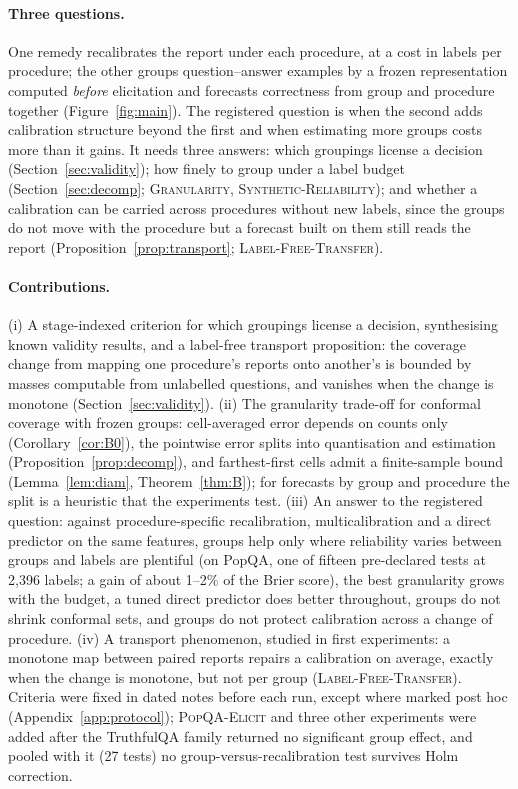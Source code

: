 \documentclass[twoside]{article}
\theoremstyle{definition}
\theoremstyle{remark}
\newcommand{\1}{\mathbf{1}}
\newcommand{\expname}[1]{\textsc{#1}}
\begin{document}
\paragraph{Three questions.} One remedy recalibrates the report under each procedure, at a cost in labels per
procedure; the other groups question--answer examples by a frozen representation computed \emph{before}
elicitation and forecasts correctness from group and procedure together (Figure~\ref{fig:main}). The registered
question is when the second adds calibration structure beyond the first and when estimating more groups costs
more than it gains. It needs three answers: which groupings license a decision (Section~\ref{sec:validity}); how
finely to group under a label budget (Section~\ref{sec:decomp}; \expname{Granularity}, \expname{Synthetic-Reliability}); and
whether a calibration can be carried across procedures without new labels, since the groups do not move with
the procedure but a forecast built on them still reads the report (Proposition~\ref{prop:transport};
\expname{Label-Free-Transfer}).

\paragraph{Contributions.}
(i) A stage-indexed criterion for which groupings license a decision, synthesising known validity
results, and a label-free transport proposition: the coverage change from mapping one procedure's reports
onto another's is bounded by masses computable from unlabelled questions, and vanishes when the change is
monotone (Section~\ref{sec:validity}).
(ii) The granularity trade-off for conformal coverage with frozen groups: cell-averaged error depends on
counts only (Corollary~\ref{cor:B0}), the pointwise error splits into quantisation and estimation
(Proposition~\ref{prop:decomp}), and farthest-first cells admit a finite-sample bound (Lemma~\ref{lem:diam},
Theorem~\ref{thm:B}); for forecasts by group and procedure the split is a heuristic that the experiments test.
(iii) An answer to the registered question: against procedure-specific recalibration, multicalibration
and a direct predictor on the same features, groups help only where reliability varies between groups and
labels are plentiful (on PopQA, one of fifteen pre-declared tests at 2{,}396 labels; a gain of about 1--2\%
of the Brier score), the best granularity grows with the budget, a tuned direct predictor does better
throughout, groups do not shrink conformal sets, and groups do not protect calibration across a change of
procedure.
(iv) A transport phenomenon, studied in first experiments: a monotone map between paired reports repairs a
calibration on average, exactly when the change is monotone, but not per group (\expname{Label-Free-Transfer}).
Criteria were fixed in dated notes before each run, except where marked post hoc (Appendix~\ref{app:protocol});
\expname{PopQA-Elicit} and three other experiments were added after the TruthfulQA family returned no significant
group effect, and pooled with it (27 tests) no group-versus-recalibration test survives Holm correction. 
\end{document}
